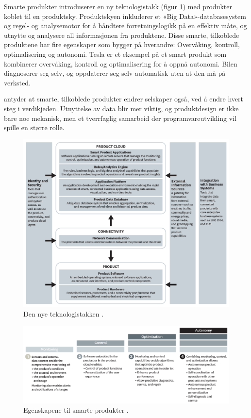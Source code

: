 Smarte produkter introduserer en ny teknologistakk (figur \ref{fig:iot_harvard_smart}) med produkter koblet til
en produktsky. Produktskyen inkluderer et «Big Data»-databasesystem og regel- og analysemotor for å håndtere
forretningslogikk på en effektiv måte, og utnytte og analysere all informasjonen fra produktene.
Disse smarte, tilkoblede produktene har fire egenskaper som bygger på hverandre: Overvåking, kontroll,
optimalisering og autonomi. Tesla er et eksempel på et smart produkt som kombinerer overvåking, kontroll og
optimalisering for å oppnå autonomi. Bilen diagnoserer seg selv, og oppdaterer seg selv automatisk uten
at den må på verksted.

\citet{iot_harvard_smartcompanies} antyder at smarte, tilkoblede produkter endrer selskaper også, ved
å endre hvert steg i verdikjeden. Utnyttelse av data blir mer viktig, og produktdesign er ikke bare noe
mekanisk, men et tverrfaglig samarbeid der programvareutvikling vil spille en større rolle. 

\begin{figure}
\includegraphics[width=1.1\textwidth,center]{fig/harvard_technology}
\caption{Den nye teknologistakken \citep{iot_harvard_smart}.}
\label{fig:iot_harvard_smart}
\end{figure}

\begin{figure}
\includegraphics[width=1.1\textwidth,center]{fig/harvard_capabilities}
\caption{Egenskapene til smarte produkter \citep{iot_harvard_smart}.}
\label{fig:iot_harvard_capabilities}
\end{figure}


